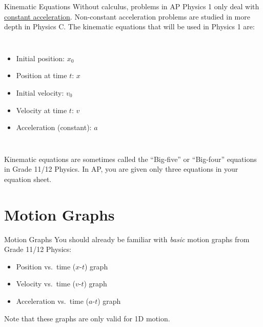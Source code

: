 \documentclass[12pt,compress,aspectratio=169]{beamer}
\begin{document}
\begin{frame}{Kinematic Equations}
  Without calculus, problems in AP Physics 1 only deal with
  \underline{constant acceleration}. Non-constant acceleration problems are
  studied in more depth in Physics C. The kinematic equations that will be used
  in Physics 1 are:
  \begin{columns}

    \vspace{-.3in}{\Large
      \begin{align*}
        x &= x_0+ v_0t + \frac12at^2\\
        v &= v_0+at\\
        v^2 &= v_0^2+ 2a(x-x_0)
      \end{align*}
    }
    
    \begin{itemize}
    \item Initial position: $x_0$
    \item Position at time $t$: $x$
    \item Initial velocity: $v_0$
    \item Velocity at time $t$: $v$
    \item Acceleration (constant): $a$
    \end{itemize}
  \end{columns}
  Kinematic equations are sometimes called the ``Big-five'' or ``Big-four''
  equations in Grade 11/12 Physics. In AP, you are given only three equations
  in your equation sheet.
\end{frame}



\section{Motion Graphs}

\begin{frame}{Motion Graphs}
  You should already be familiar with \emph{basic} motion graphs from Grade
  11/12 Physics:
  \begin{itemize}
  \item Position vs.\ time ($x$-$t$) graph
  \item Velocity vs.\ time ($v$-$t$) graph
  \item Acceleration vs.\ time ($a$-$t$) graph
  \end{itemize}
  Note that these graphs are only valid for 1D motion.
\end{frame}
\end{document}
